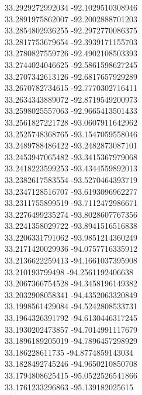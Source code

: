 {33.2929272992034	-92.1029510308946\\
33.2891975862007	-92.2002888701203\\
33.2854802936255	-92.2972770086375\\
33.2817753679654	-92.3939171155703\\
33.2780827559726	-92.4902108503393\\
33.2744024046625	-92.5861598627245\\
33.2707342613126	-92.6817657929289\\
33.2670782734615	-92.7770302716411\\
33.2634343889072	-92.8719549200973\\
33.2598025557063	-92.9665413501433\\
33.2561827221728	-93.0607911642962\\
33.2525748368765	-93.1547059558046\\
33.2489788486422	-93.2482873087101\\
33.2453947065482	-93.3415367979068\\
33.2418223599253	-93.4344559892013\\
33.2382617583554	-93.5270464393719\\
33.2347128516707	-93.6193096962277\\
33.2311755899519	-93.7112472986671\\
33.2276499235274	-93.8028607767356\\
33.2241358029722	-93.8941516516838\\
33.2206331791062	-93.9851214360249\\
33.2171420029936	-94.0757716335912\\
33.2136622259413	-94.1661037395908\\
33.210193799498	-94.2561192406638\\
33.2067366754528	-94.3458196149382\\
33.2032908058341	-94.4352063320849\\
33.1998561429084	-94.5242808533731\\
33.1964326391792	-94.6130446317245\\
33.1930202473857	-94.7014991117679\\
33.1896189205019	-94.7896457298929\\
33.186228611735	-94.8774859143034\\
33.1828492745246	-94.9650210850708\\
33.1794808625415	-95.0522526541866\\
33.1761233296863	-95.139182025615\\
}
